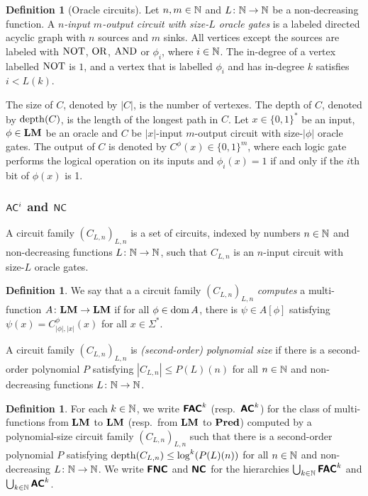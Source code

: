 \documentclass{article}
\theoremstyle{definition}
\newtheorem{definition}[theorem]{Definition}
\theoremstyle{remark}
\begin{document}
\begin{definition}[Oracle circuits]
Let $n, m \in \mathbb N$ and $L \colon \mathbb N \to \mathbb N$ be a non-decreasing function.
A \emph{$n$-input $m$-output circuit with size-$L$ oracle gates} is 
a labeled directed acyclic graph with $n$ sources and $m$ sinks.
All vertices except the sources are labeled with $\mathrm{NOT}$, $\mathrm{OR}$, $\mathrm{AND}$ 
or $\phi _i$, where $i \in \mathbb N$.
The in-degree of a vertex labelled $\mathrm{NOT}$ is $1$, and
a vertex that is labelled $\phi _i$ and has in-degree $k$ 
satisfies $i < L(k)$.

The size of $C$, denoted by $|C|$, is the number of vertexes.
The depth of $C$, denoted by $\mathop{\rm depth}(C)$, is the length of the longest path in $C$.
Let $x \in \{0, 1\}^*$ be an input, $\phi \in \mathbf{LM}$ be an oracle and
$C$ be $|x|$-input $m$-output circuit with size-$|\phi|$ oracle gates.
The output of $C$ is denoted by $C^\phi(x) \in \{0, 1\}^m$,
where each logic gate performs the logical operation on its inputs
and $\phi_i(x) = 1$ if and only if the $i$th bit of $\phi(x)$ is 1.
\end{definition}


\subsubsection{\texorpdfstring{$\mathsf{AC}^i$ and $\mathsf{NC}$}{ACi and NCi}}

A circuit family $(C_{L,n})_{L,n}$ is a set of circuits, 
indexed by numbers $n \in \mathbb N$ and non-decreasing functions $L \colon \mathbb N \to \mathbb N$,
such that $C_{L, n}$ is an $n$-input circuit with size-$L$ oracle gates.

\begin{definition}
 We say that a a circuit family $(C_{L,n})_{L,n}$ 
\emph{computes} a multi-function 
 $A \colon \mathbf{LM} \to \mathbf{LM}$ if for all $\phi \in \mathop{\rm dom} A$, 
 there is $\psi \in A[\phi]$ satisfying $\psi(x) = C_{|\phi|, |x|}^\phi(x)$
 for all $x \in \Sigma^*$.
\end{definition}

A circuit family $(C_{L,n})_{L,n}$ is \emph{(second-order) polynomial size}
if there is a second-order polynomial $P$ satisfying
$|C_{L,n}| \le P(L)(n)$ for all $n \in \mathbb N$ and non-decreasing functions
$L \colon \mathbb N \to \mathbb N$.


\begin{definition}
 For each $k \in \mathbb N$, 
 we write $\text{\bfseries \sffamily \upshape FAC}^k$ (resp.\ $\text{\bfseries \sffamily \upshape AC}^k$) for the class of 
 multi-functions from $\mathbf{LM}$ to $\mathbf{LM}$ (resp.\ from $\mathbf{LM}$ to $\mathbf{Pred}$) computed by
 a polynomial-size circuit family $(C_{L,n})_{L,n}$ such that
 there is a second-order polynomial $P$ satisfying
 $\mathop{\rm depth}(C_{L,n}) \le \log^k(P(L)(n))$ 
 for all $n \in \mathbb N$ and non-decreasing
 $L \colon \mathbb N \to \mathbb N$.
 We write $\text{\bfseries \sffamily \upshape FNC}$ and $\text{\bfseries \sffamily \upshape NC}$ for the hierarchies
 $\bigcup_{k \in \mathbb N} \text{\bfseries \sffamily \upshape FAC}^k$ and $\bigcup_{k \in \mathbb N} \text{\bfseries \sffamily \upshape AC}^k$.
\end{definition}
\end{document}
